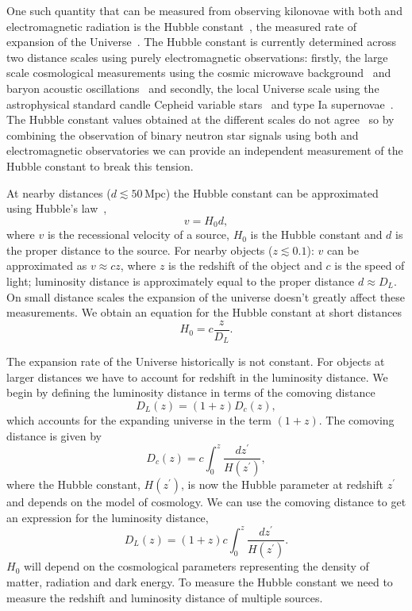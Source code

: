 One such quantity that can be measured from observing kilonovae with both \gws and electromagnetic radiation is the Hubble constant~\cite{Schutz:1986}, the measured rate of expansion of the Universe~\cite{hubble:1929}. The Hubble constant is currently determined across two distance scales using purely electromagnetic observations: firstly, the large scale cosmological measurements using the cosmic microwave background~\cite{WMAP_H0:2003} and baryon acoustic oscillations~\cite{BAO_H0:2009} and secondly, the local Universe scale using the astrophysical standard candle Cepheid variable stars~\cite{Cepheids_H0:2001} and type Ia supernovae~\cite{TypeIa_H0:1998}. The Hubble constant values obtained at the different scales do not agree~\cite{H0_tension:2020} so by combining the observation of binary neutron star signals using both \gw and electromagnetic observatories we can provide an independent measurement of the Hubble constant to break this tension.

At nearby distances ($d \lesssim 50 \, \text{Mpc}$) the Hubble constant can be approximated using Hubble's law~\cite{hubble:1929},
%
\begin{equation}
    v = H_{0} d,
    \label{6:eq:basic_hubbles_law}
\end{equation}
%
where $v$ is the recessional velocity of a source, $H_{0}$ is the Hubble constant and $d$ is the proper distance to the source. For nearby objects ($z \lesssim 0.1$): $v$ can be approximated as $v \approx cz$, where $z$ is the redshift of the object and $c$ is the speed of light; luminosity distance is approximately equal to the proper distance $d \approx D_{L}$. On small distance scales the expansion of the universe doesn't greatly affect these measurements. We obtain an equation for the Hubble constant at short distances
%
\begin{equation}
    H_{0} = c \frac{z}{D_{L}}.
    \label{6:eq:hubbles-law}
\end{equation}
%

The expansion rate of the Universe historically is not constant. For objects at larger distances we have to account for redshift in the luminosity distance. We begin by defining the luminosity distance in terms of the comoving distance
%
\begin{equation}
    D_{L}(z) = (1 + z)D_{c}(z),
\end{equation}
%
which accounts for the expanding universe in the term $(1 + z)$. The comoving distance is given by
%
\begin{equation}
    D_{c}(z) = c \int^{z}_{0} \frac{dz^{\prime}}{H(z^{\prime})},
\end{equation}
%
where the Hubble constant, $H(z^{\prime})$, is now the Hubble parameter at redshift $z^{\prime}$ and depends on the model of cosmology.
We can use the comoving distance to get an expression for the luminosity distance,
%
\begin{equation}
    D_{L}(z) = (1 + z) c \int^{z}_{0} \frac{dz^{\prime}}{H(z^{\prime})}.
\end{equation}
%
$H_{0}$ will depend on the cosmological parameters representing the density of matter, radiation and dark energy. To measure the Hubble constant we need to measure the redshift and luminosity distance of multiple sources.

